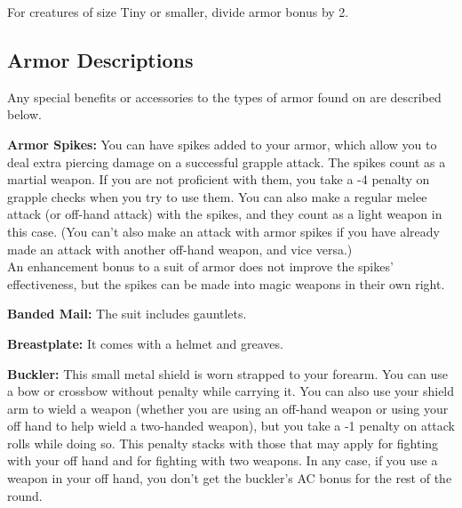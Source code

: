 For creatures of size Tiny or smaller, divide armor bonus by 2.


\subsection{Armor Descriptions}
Any special benefits or accessories to the types of armor found on  are described below.

\textbf{Armor Spikes:} You can have spikes added to your armor, which allow you to deal extra piercing damage on a successful grapple attack. The spikes count as a martial weapon. If you are not proficient with them, you take a -4 penalty on grapple checks when you try to use them. You can also make a regular melee attack (or off-hand attack) with the spikes, and they count as a light weapon in this case. (You can't also make an attack with armor spikes if you have already made an attack with another off-hand weapon, and vice versa.)\\An enhancement bonus to a suit of armor does not improve the spikes' effectiveness, but the spikes can be made into magic weapons in their own right.

\textbf{Banded Mail:} The suit includes gauntlets.

\textbf{Breastplate:} It comes with a helmet and greaves.

\textbf{Buckler:} This small metal shield is worn strapped to your forearm. You can use a bow or crossbow without penalty while carrying it. You can also use your shield arm to wield a weapon (whether you are using an off-hand weapon or using your off hand to help wield a two-handed weapon), but you take a -1 penalty on attack rolls while doing so. This penalty stacks with those that may apply for fighting with your off hand and for fighting with two weapons. In any case, if you use a weapon in your off hand, you don't get the buckler's AC bonus for the rest of the round.

